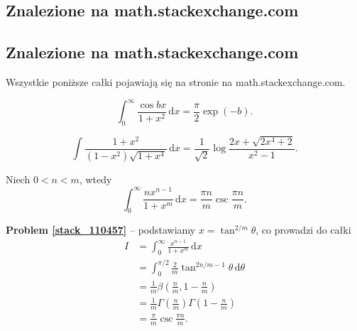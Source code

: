 %

\subsection{Znalezione na math.stackexchange.com}
\subsection{Znalezione na math.stackexchange.com}
Wszystkie poniższe całki pojawiają się na stronie na math.stackexchange.com.


\begin{problem}[pytanie 9402]
    \label{stack_9402}%
    \begin{equation}
        \int_0^\infty \frac {\cos b x}{1+x^2} \,\mathrm{d}x = \frac{\pi} 2 \exp(-b).
    \end{equation}
\end{problem}


\begin{problem}[pytanie 15719]
    \label{stack_15719}%
    \begin{equation}
        \int \frac{1 + x^2}{(1 - x^2) \sqrt{1 + x^4}} \,\mathrm{d}x = \frac{1}{\sqrt 2} \log \frac{2x + \sqrt{2x^4 + 2}}{x^2 - 1}.
    \end{equation}
\end{problem}


\begin{problem_with_solution}[pytanie 110457]
    \label{stack_110457}%
    Niech $0 < n < m$, wtedy
    \begin{equation}
        \int_0^\infty \frac{n x^{n-1}}{1 + x^m} \,\mathrm{d} x = \frac {\pi n} m \operatorname{csc} \frac {\pi n}{m}.
    \end{equation}
\end{problem_with_solution}

\textbf{Problem \ref{stack_110457}} -- podstawiamy $x = \tan^{2/m} \theta$, co prowadzi do całki
\begin{align}
    I & = \int_0^\infty \frac{x^{n-1}}{1 + x^m} \,\mathrm{d} x \\
      & = \int_0^{\pi/2} \frac 2 m \tan^{2n/m - 1} \theta \,\mathrm{d}\theta \\
      & = \frac 1 m \beta\left( \frac nm, 1 - \frac nm \right) \\
      & = \frac 1 m \Gamma \left(\frac nm\right) \Gamma \left(1 - \frac nm\right) \\
      & = \frac \pi m \operatorname{csc} \frac {\pi n}{m}.
\end{align}

